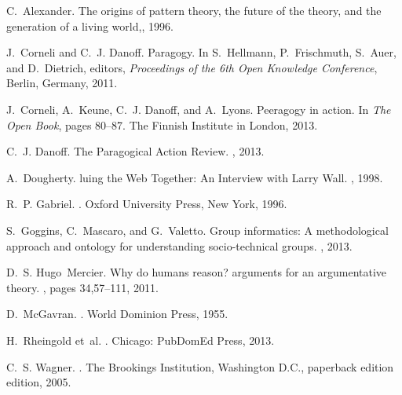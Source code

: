 \documentclass{acm_proc_article-sp}
\begin{document}

\begin{thebibliography}{10}

C.~Alexander.
\newblock The origins of pattern theory, the future of the theory, and the
  generation of a living world,, 1996.

J.~Corneli and C.~J. Danoff.
\newblock Paragogy.
\newblock In S.~Hellmann, P.~Frischmuth, S.~Auer, and D.~Dietrich, editors,
  {\em Proceedings of the 6th Open Knowledge Conference}, Berlin, Germany,
  2011.

J.~Corneli, A.~Keune, C.~J. Danoff, and A.~Lyons.
\newblock Peeragogy in action.
\newblock In {\em The Open Book}, pages 80--87. The Finnish Institute in
  London, 2013.

C.~J. Danoff.
\newblock The {P}aragogical {A}ction {R}eview.
, 2013.

A.~Dougherty.
luing the {W}eb {T}ogether: {A}n {I}nterview with {L}arry {W}all.
, 1998.

R.~P. Gabriel.
.
\newblock Oxford University Press, New York, 1996.

S.~Goggins, C.~Mascaro, and G.~Valetto.
\newblock Group informatics: A methodological approach and ontology for
  understanding socio-technical groups.
, 2013.

D.~S. Hugo~Mercier.
\newblock Why do humans reason? arguments for an argumentative theory.
, pages 34,57--111, 2011.

D.~McGavran.
.
\newblock World Dominion Press, 1955.

H.~Rheingold et~al.
.
\newblock Chicago: PubDomEd Press, 2013.

C.~S. Wagner.
.
\newblock The Brookings Institution, Washington D.C., paperback edition
  edition, 2005.

\end{thebibliography}

\balancecolumns
\end{document}
